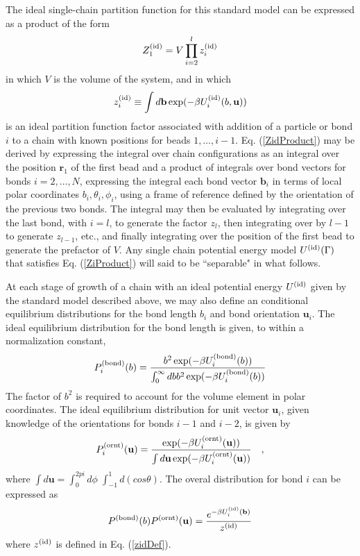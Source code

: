 \documentclass[12pt]{article} %
\newcommand{\vv}[1]{\mathbf{#1}}
\newcommand\chain{\Gamma}
\newcommand\Uid{U^{({\rm id})}}
\newcommand\Zid{Z^{({\rm id})}}
\newcommand\qbead{\vv{r}_{1}}
\newcommand\nbead{l}
\newcommand\vbond{\vv{b}}
\newcommand\ubond{\vv{u}}
\newcommand\rbond{b}
\newcommand\Ubond{U^{({\rm bond})}}
\newcommand\Uornt{U^{({\rm ornt})}}
\newcommand\Pbond{P^{({\rm bond})}}
\newcommand\Pornt{P^{({\rm ornt})}}
\newcommand\zid{z^{({\rm id})}}
\begin{document}
The ideal single-chain partition function for this standard model can be expressed as a product of the form
\begin{equation}
    \Zid_{1} = V \prod_{i=2}^{\nbead} \zid_{i}
    \label{ZidProduct}
\end{equation}
in which $V$ is the volume of the system, and in which
\begin{equation}
    \zid_{i} \equiv \int d\vbond 
    \exp( -\beta \Uid_{i}(\rbond, \ubond) )
    \label{zidDef}
\end{equation}
is an ideal partition function factor associated with addition of a particle or bond $i$ to a chain with known positions for beads $1, \ldots, i-1$. Eq.  (\ref{ZidProduct}) may be derived by expressing the integral over chain configurations as an integral over the position $\qbead$ of the first bead and a product of integrals over bond vectors for bonds $i=2,\ldots,N$, expressing the integral each bond vector $\vbond_{i}$ in terms of local polar coordinates $b_{i}, \theta_{i}, \phi_{i}$, using a frame of reference defined by the orientation of the previous two bonds. The integral may then be evaluated by integrating over the last bond, with $i=\nbead$, to generate the factor $z_{\nbead}$, then integrating over by $\nbead-1$ to generate $z_{\nbead-1}$, etc., and finally integrating over the position of the first bead to generate the prefactor of $V$. Any single chain potential energy model $\Uid(\chain)$ that satisfies Eq. (\ref{ZiProduct}) will said to be ``separable" in what follows. 

At each stage of growth of a chain with an ideal potential energy $\Uid$ given by the standard model described above, we may also define an conditional equilibrium distributions for the bond length $\rbond_{i}$ and bond orientation $\ubond_{i}$. The ideal equilibrium distribution for the bond length is given, to within a normalization constant,
\begin{equation}
    \Pbond_{i}(\rbond) = 
    \frac{\rbond^{2} \exp( -\beta \Ubond_{i}(\rbond) )}
         {\int_{0}^{\infty}d\rbond \rbond^{2} \exp( -\beta \Ubond_{i}(\rbond) )}
\end{equation}
The factor of $\rbond^{2}$ is required to account for the volume element in polar coordinates.  The ideal equilibrium distribution for unit vector $\ubond_{i}$, given knowledge of the orientations for bonds $i-1$ and $i-2$, is given by
\begin{equation}
    \Pornt_{i}(\ubond) =
    \frac{\exp( -\beta \Uornt_{i}(\ubond))}
         {\int d\ubond \exp( -\beta \Uornt_{i}(\ubond))}
    \quad,
\end{equation}
where $\int d\ubond = \int_{0}^{2pi}d\phi \; \int_{-1}^{1}d(cos\theta)$.
The overal distribution for bond $i$ can be expressed as
\begin{equation}
   \Pbond(\rbond)\Pornt(\ubond) = \frac{e^{-\beta\Uid_{i}(\vbond) }} {\zid}
   \label{PtrialNormalized}
\end{equation}
where $\zid$ is defined in Eq. (\ref{zidDef}).
\end{document}
